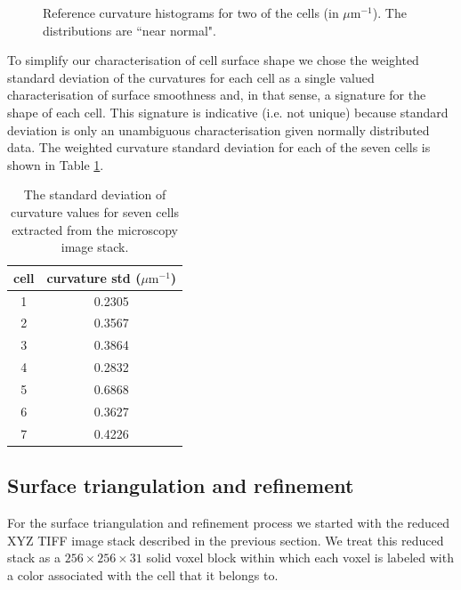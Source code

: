 \documentclass[10pt,letterpaper]{article}
\begin{document}
\begin{figure}[h!]
\caption{Reference curvature histograms for two of the cells (in $\mu \textrm{m}^{-1}$). The distributions are ``near normal".}
\label{fig:ref_histogram}
\end{figure}

To simplify our characterisation of cell surface shape we chose the weighted standard deviation of the curvatures for each cell as a single valued characterisation of surface smoothness and, in that sense, a signature for the shape of each cell.
This signature is indicative (i.e. not unique) because standard deviation is only an unambiguous characterisation given normally distributed data.
The weighted curvature standard deviation for each of the seven cells is shown in Table \ref{tab:ref_curv}.\\ 

\begin{table}[ht!]
\begin{center}
\begin{tabular}{|c|c|}
\hline
\rule{0pt}{3ex} cell &curvature std ($\mu \textrm{m}^{-1}$) \\
\hline
\rule{0pt}{3ex} 1 &0.2305\\
2 &0.3567\\
3 & 0.3864\\
4 &0.2832\\
5 &0.6868\\
6 &0.3627\\
7 & 0.4226\\
\hline
\end{tabular}
\end{center}
\caption{The standard deviation of curvature values for seven cells extracted from the microscopy image stack.}
\label{tab:ref_curv}
\end{table}

\subsection*{Surface triangulation and refinement}

For the surface triangulation and refinement process we started with the reduced XYZ TIFF image stack described in the previous section. We treat this reduced stack as a $256\times 256 \times 31$ solid voxel block within which each voxel is labeled with a color associated with the cell that it belongs to. 
\end{document}
